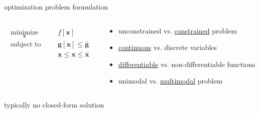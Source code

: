 \documentclass[aspectratio=169]{beamer}
\begin{document}
\begin{frame}{optimization problem formulation}



\vfill

\begin{columns}
\begin{column}{.5\textwidth}
\centering
\begin{align*}
\begin{aligned}
\underset{\mathbf{x}}{\text{minimize}}  &&& f\left[\mathbf{x}\right]\\
\text{subject to} &&& \mathbf{g}\left[\mathbf{x}\right] \leq \bar{\mathbf{g}}\\
&&& \underline{\mathbf{x}} \leq \mathbf{x} \leq \overline{\mathbf{x}}
\end{aligned}
\end{align*}
\end{column}

\begin{column}{.6\textwidth}
\centering
\begin{itemize}
\pause
    \item unconstrained vs. \underline{constrained} problem
    \item \underline{continuous} vs. discrete variables
    \pause
    \item \underline{differentiable} vs. non-differentiable functions
    \pause
    \item unimodal vs. \underline{multimodal} problem
\end{itemize}
\end{column}

\end{columns}

\vfill

\centering
\pause
typically no closed-form solution



\end{frame}
\end{document}
